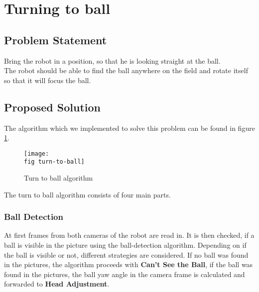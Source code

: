 \section{Turning to ball}
\label{j sec turning to ball}
\subsection*{Problem Statement}
Bring the robot in a position, so that he is looking straight at the ball.	\\
The robot should be able to find the ball anywhere on the field and rotate itself so that it will focus the ball. 

\subsection*{Proposed Solution}
The algorithm which we implemented to solve this problem can be found in figure \ref{j figure turn to ball}.

\begin{figure}[ht]
	\texttt{[image: \\fig turn-to-ball]}
	\caption{Turn to ball algorithm}
	\label{j figure turn to ball}
\end{figure}

The turn to ball algorithm consists of four main parts. 

\subsubsection{Ball Detection} 
At first frames from both cameras of the robot are read in. It is then checked, if a ball is visible in the picture using the ball-detection algorithm. Depending on if the ball is visible or not, different strategies are considered. If no ball was found in the pictures, the algorithm proceeds with \textbf{Can't See the Ball}, if the ball was found in the pictures, the ball yaw angle in the camera frame is calculated and forwarded to \textbf{Head Adjustment}.

